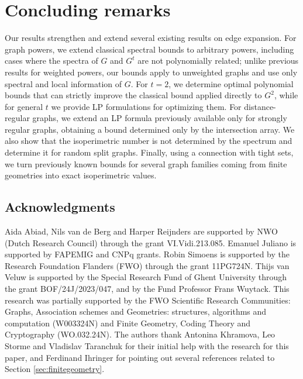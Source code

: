 \documentclass[a4paper,11pt]{article}
\theoremstyle{definition}
\begin{document}
\section{Concluding remarks}
Our results strengthen and extend several existing results on edge expansion. For graph powers, we extend classical spectral bounds to arbitrary powers, including cases where the spectra of $G$ and $G^t$ are not polynomially related; unlike previous results for weighted powers, our bounds apply to unweighted graphs and use only spectral and local information of $G$. For $t=2$, we determine optimal polynomial bounds that can strictly improve the classical bound applied directly to $G^2$, while for general $t$ we provide LP formulations for optimizing them. For distance-regular graphs, we extend an LP formula previously available only for strongly regular graphs, obtaining a bound determined only by the intersection array. We also show that the isoperimetric number is not determined by the spectrum and determine it for random split graphs. Finally, using a connection with tight sets, we turn previously known bounds for several graph families coming from finite geometries into exact isoperimetric values.

\subsection*{Acknowledgments}

Aida Abiad, Nils van de Berg and Harper Reijnders are supported by NWO (Dutch Research Council) through the grant VI.Vidi.213.085. Emanuel Juliano is supported by FAPEMIG and CNPq grants. Robin Simoens is supported by the Research Foundation Flanders (FWO) through the grant 11PG724N. Thijs van Veluw is supported by the Special Research Fund of Ghent University through the grant BOF/24J/2023/047, and by the Fund Professor Frans Wuytack. This research was partially supported by the FWO Scientific Research Communities: Graphs, Association schemes and Geometries: structures, algorithms and
computation (W003324N) and Finite Geometry, Coding Theory and Cryptography (WO.032.24N).
The authors thank Antonina Khramova, Leo Storme and Vladislav Taranchuk for their initial help with the research for this paper, and Ferdinand Ihringer for pointing out several references related to Section \ref{sec:finitegeometry}.
\end{document}
